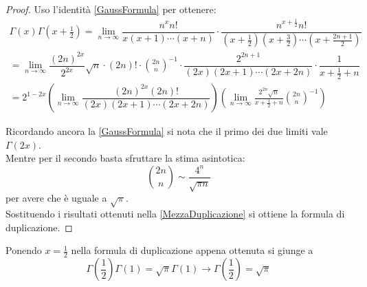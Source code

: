 \begin{proof}
Uso l'identità \ref{GaussFormula} per ottenere:
\begin{equation}
\label{MezzaDuplicazione}
\begin{split}
\Gamma(x)\Gamma\left(x+\frac12\right) = \lim_{n\to\infty} 
\dfrac{n^xn!}{x(x+1)\cdots (x+n)} \cdot \dfrac{n^{x+\frac12} n!}{\left(x+\frac12\right)\left(x+\frac32\right)\cdots \left(x+\frac{2n+1}2\right)}\\
 =\lim_{n\to\infty} \dfrac{(2n)^{2x}}{2^{2x}}\sqrt{n}\cdot (2n)!\cdot\binom{2n}{n}^{-1}\cdot \dfrac{2^{2n+1}}{(2x)(2x+1)\cdots(2x+2n)}\cdot \dfrac{1}{x+\frac12+n} \\
 =2^{1-2x} \left(\lim_{n\to\infty} \dfrac{ (2n)^{2x}(2n)! }{ (2x)(2x+1)\cdots(2x+2n) }\right) 
  \left( \lim_{n\to\infty} \frac{2^{2n}\sqrt{n}}{x+\frac12+n} \binom{2n}{n}^{-1}\right)
\end{split}
\end{equation}

Ricordando ancora la \ref{GaussFormula} si nota che il primo dei due limiti vale $\Gamma(2x)$.\\
Mentre per il secondo basta sfruttare la stima asintotica:
\begin{equation*}
	\binom{2n}{n}\sim \frac{4^n}{\sqrt{\pi n }}
\end{equation*}
per avere che è uguale a $\sqrt{\pi}$.\\
Sostituendo i risultati ottenuti nella \eqref{MezzaDuplicazione} si ottiene la formula di duplicazione.
\end{proof}

\begin{remark}
Ponendo $x=\frac12$ nella formula di duplicazione appena ottenuta si giunge a 
\begin{equation*}
  \Gamma\left(\frac12\right)\Gamma(1)=\sqrt{\pi}\Gamma(1) \to \Gamma\left(\frac12\right)=\sqrt{\pi}
\end{equation*}
\end{remark}

